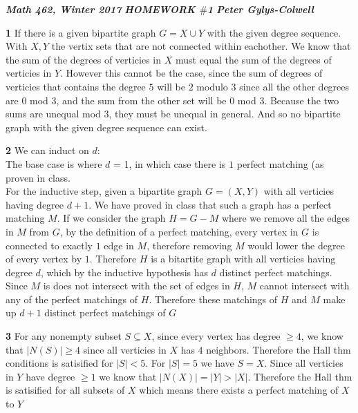 \documentclass[12pt]{article}
\newenvironment{ques}{\vspace{2 ex}}{\vspace{2 ex}}
\theoremstyle{definition}
\begin{document}
\noindent \textit{\textbf{Math 462, Winter 2017}} \hspace{1.3cm}
\textit{\textbf{HOMEWORK $\#$1}} \hspace{1.3cm} \textit{\textbf{Peter
Gylys-Colwell}} 

\vspace{1cm}
\begin{ques}
	\textbf{1}
	If there is a given bipartite graph $G = X \cup Y$ with the
	given degree sequence. With $X, Y$ the vertix sets that are not
	connected within eachother. We know that the sum of the degrees
	of verticies in $X$ must equal the sum of the degrees of
	verticies in $Y$. However this cannot be the case, since the sum of
	degrees of verticies that contains the degree $5$ will be $2$
	modulo $3$ since all the other degrees are $0$ mod $3$, and the
	sum from the other set will be $0$ mod $3$. Because the two
	sums are unequal mod $3$, they must be unequal in general. And
	so no bipartite graph with the given degree sequence can exist.
\end{ques}

\begin{ques}
	\textbf{2}
	We can induct on $d$:\\
	The base case is where $d$ = 1, in which case there is $1$ perfect
	matching (as proven in class.\\
	For the inductive step, given a bipartite graph $G = (X, Y)$ with all
	verticies having degree $d + 1$. We have proved in class that such a
	graph has a perfect matching $M$. If we consider the graph $H = G - M$
	where we remove all the edges in $M$ from $G$, by the definition of a
	perfect matching, every vertex in $G$ is connected to exactly $1$ edge
	in $M$, therefore removing $M$ would lower the degree of every vertex
	by $1$. Therefore $H$ is a bitartite graph with all verticies having
	degree $d$, which by the inductive hypothesis has $d$ distinct perfect
	matchings. Since $M$ is does not intersect with the set of edges in
	$H$, $M$ cannot intersect with any of the perfect matchings of $H$.
	Therefore these matchings of $H$ and $M$ make up $d + 1$ distinct
	perfect matchings of $G$
\end{ques}

\begin{ques}
	\textbf{3}
	For any nonempty subset $S \subseteq X$, since every vertex has degree
	$\geq 4$, we know that $|N(S)| \geq 4$ since all verticies in $X$ has
	$4$ neighbors. Therefore the Hall thm conditions is satisified for $|S|
	< 5$. For $|S| = 5$ we have $S = X$. Since all verticies in $Y$ have
	degree $\geq 1$ we know that $|N(X)| = |Y| > |X|$. Therefore the Hall
	thm is satisified for all subsets of $X$ which means there exists a
	perfect matching of $X$ to $Y$
\end{ques}
\end{document}
